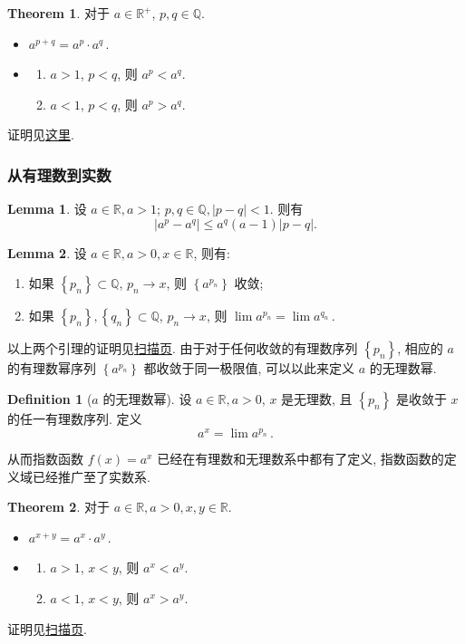 \documentclass{book}
\newcommand{\set}[1]{\left\{#1\right\}}
\newcommand{\abs}[1]{\left\lvert #1 \right\rvert}
\newcommand{\R}{\mathbb{R}}
\newcommand{\Q}{\mathbb{Q}}
\renewcommand{\le}{\leqslant}
\numberwithin{equation}{section}
\numberwithin{figure}{section}
\theoremstyle{definition}
\newtheorem{definition}{Definition}
\newtheorem{theorem}{Theorem}[section]
\newtheorem{lemma}{Lemma}[section]
\begin{document}
\begin{theorem}
  对于 $a\in\R^+$, $p,q\in\Q$.
  \begin{itemize}
    \item 
      \(
	a^{p+q}=a^p\cdot a^q\,.
      \)
    \item 
      \begin{enumerate}
	\item $a>1$, $p<q$, 则 $a^p<a^q$.
	\item $a<1$, $p<q$, 则 $a^p>a^q$.
      \end{enumerate}
  \end{itemize}
  \label{the:ExponentQTheorem}
\end{theorem}
证明见\hyperlink{proof:ExponentQTheorem}{这里}.

\subsubsection{从有理数到实数}
\begin{lemma}
  设 $a\in\R,a>1$; $p,q\in\Q,\abs{p-q}<1$. 则有
  \begin{equation*}
    \abs{a^p-a^q}\le a^q(a-1)\abs{p-q}.
  \end{equation*}
\end{lemma}
\begin{lemma}
  设 $a\in\R,a>0,x\in\R$, 则有:
  \begin{enumerate}
    \item 如果 $\set{p_n}\subset\Q$, $p_n\to x$, 则 $\set{a^{p_n}}$ 收敛;
    \item 如果 $\set{p_n},\set{q_n}\subset\Q$, $p_n\to x$, 则 $\lim a^{p_n}=\lim a^{q_n}$\,.
  \end{enumerate}
\end{lemma}
以上两个引理的证明见\hyperlink{scan:TwoLemmasForExponent}{扫描页}.
由于对于任何收敛的有理数序列 $\set{p_n}$, 相应的 $a$ 的有理数幂序列 $\set{a^{p_n}}$ 都收敛于同一极限值, 可以以此来定义 $a$ 的无理数幂.
\begin{definition}[$a$ 的无理数幂]
  设 $a\in\R,a>0$, $x$ 是无理数, 且 $\set{p_n}$ 是收敛于 $x$ 的任一有理数序列. 定义
  \begin{equation*}
    a^x=\lim a^{p_n}\,.
  \end{equation*}
\end{definition}

从而指数函数 $f(x)=a^x$ 已经在有理数和无理数系中都有了定义, 指数函数的定义域已经推广至了实数系.

\begin{theorem}
  对于 $a\in\R,a>0,x,y\in\R$.
  \begin{itemize}
    \item 
      \(
	a^{x+y}=a^x\cdot a^y\,.
      \)
    \item 
      \begin{enumerate}
	\item $a>1$, $x<y$, 则 $a^x<a^y$.
	\item $a<1$, $x<y$, 则 $a^x>a^y$.
      \end{enumerate}
  \end{itemize}
\end{theorem}
证明见\hyperlink{scan:ExponentFunction}{扫描页}.
\end{document}
